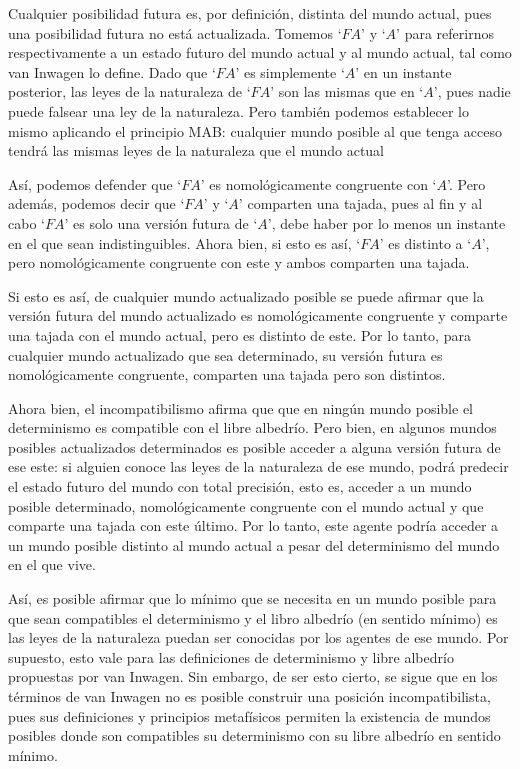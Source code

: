 \documentclass[12pt]{article} %
\begin{document}
Cualquier posibilidad futura es, por definición, distinta del mundo actual, pues una posibilidad futura no está actualizada. Tomemos `$FA$' y `$A$' para referirnos respectivamente a un estado futuro del mundo actual y al mundo actual, tal como van Inwagen lo define. Dado que `$FA$' es simplemente `$A$' en un instante posterior, las leyes de la naturaleza de `$FA$' son las mismas que en `$A$', pues nadie puede falsear una ley de la naturaleza. Pero también podemos establecer lo mismo aplicando el principio MAB: cualquier mundo posible al que tenga acceso tendrá las mismas leyes de la naturaleza que el mundo actual

Así, podemos defender que `$FA$' es nomológicamente congruente con `$A$'. Pero además, podemos decir que `$FA$' y `$A$' comparten una tajada, pues al fin y al cabo `$FA$' es solo una versión futura de `$A$', debe haber por lo menos un instante en el que sean indistinguibles. Ahora bien, si esto es así, `$FA$' es distinto a `$A$', pero nomológicamente congruente con este y ambos comparten una tajada.

Si esto es así, de cualquier mundo actualizado posible se puede afirmar que la versión futura del mundo actualizado es nomológicamente congruente y comparte una tajada con el mundo actual, pero es distinto de este. Por lo tanto, para cualquier mundo actualizado que sea determinado, su versión futura es nomológicamente congruente, comparten una tajada pero son distintos.

Ahora bien, el incompatibilismo afirma que que en ningún mundo posible el determinismo es compatible con el libre albedrío. Pero bien, en algunos mundos posibles actualizados determinados es posible acceder a alguna versión futura de ese este: si alguien conoce las leyes de la naturaleza de ese mundo, podrá predecir el estado futuro del mundo con total precisión, esto es, acceder a un mundo posible determinado, nomológicamente congruente con el mundo actual y que comparte una tajada con este último. Por lo tanto, este agente podría acceder a un mundo posible distinto al mundo actual a pesar del determinismo del mundo en el que vive.

Así, es posible afirmar que lo mínimo que se necesita en un mundo posible para que sean compatibles el determinismo y el libro albedrío (en sentido mínimo) es las leyes de la naturaleza puedan ser conocidas por los agentes de ese mundo. Por supuesto, esto vale para las definiciones de determinismo y libre albedrío propuestas por van Inwagen. Sin embargo, de ser esto cierto, se sigue que en los términos de van Inwagen no es posible construir una posición incompatibilista, pues sus definiciones y principios metafísicos permiten la existencia de mundos posibles donde son compatibles su determinismo con su libre albedrío en sentido mínimo.
\end{document}
